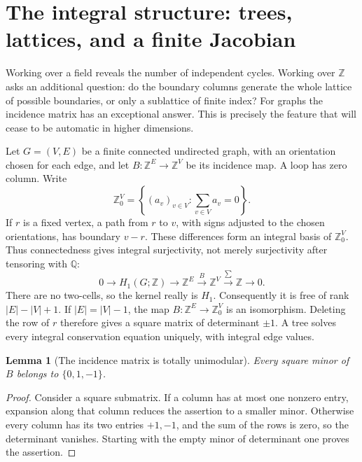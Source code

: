 \documentclass[11pt]{article}
\newtheorem{lemma}[theorem]{Lemma}
\theoremstyle{definition}
\theoremstyle{remark}
\newcommand{\Q}{\mathbb Q}
\newcommand{\Z}{\mathbb Z}
\newcommand{\R}{\mathbb R}
\newcommand{\C}{\mathbb C}
\begin{document}

\section{The integral structure: trees, lattices, and a finite Jacobian}
\label{sec:gih-integral}

Working over a field reveals the number of independent cycles.  Working over
\(\Z\) asks an additional question: do the boundary columns generate the
whole lattice of possible boundaries, or only a sublattice of finite index?
For graphs the incidence matrix has an exceptional answer.  This is precisely
the feature that will cease to be automatic in higher dimensions.

Let \(G=(V,E)\) be a finite connected undirected graph, with an orientation
chosen for each edge, and let \(B:\Z^E\to\Z^V\) be its incidence map.
A loop has zero column.  Write
\[
 \Z^V_0=\left\{(a_v)_{v\in V}:\sum_{v\in V}a_v=0\right\}.
\]
If \(r\) is a fixed vertex, a path from \(r\) to \(v\), with signs adjusted
to the chosen orientations, has boundary \(v-r\).  These differences form
an integral basis of \(\Z^V_0\).  Thus connectedness gives integral
surjectivity, not merely surjectivity after tensoring with \(\Q\):
\begin{equation}
 0\longrightarrow H_1(G;\Z)\longrightarrow\Z^E
 \xrightarrow{B}\Z^V\xrightarrow{\sum}\Z\longrightarrow0.
 \label{eq:gih-integral-sequence}
\end{equation}
There are no two-cells, so the kernel really is \(H_1\).  Consequently it
is free of rank \(|E|-|V|+1\).  If \(|E|=|V|-1\), the map
\(B:\Z^E\to\Z^V_0\) is an isomorphism.  Deleting the row of \(r\)
therefore gives a square matrix of determinant \(\pm1\).  A tree solves
every integral conservation equation uniquely, with integral edge values.

\begin{lemma}[The incidence matrix is totally unimodular]
Every square minor of \(B\) belongs to \(\{0,1,-1\}\).
\end{lemma}
\begin{proof}
Consider a square submatrix.  If a column has at most one nonzero entry,
expansion along that column reduces the assertion to a smaller minor.
Otherwise every column has its two entries \(+1,-1\), and the sum of the
rows is zero, so the determinant vanishes.  Starting with the empty minor
of determinant one proves the assertion.
\end{proof}
\end{document}
